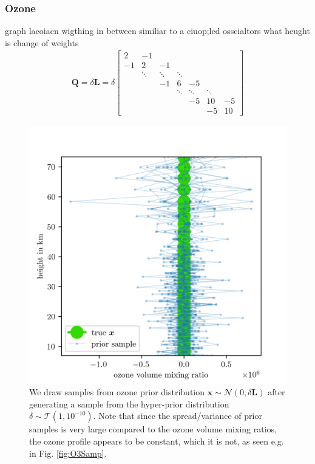 \subsubsection{Ozone}
graph lacoiacn 
wigthing in between
similiar to a ciuop;led osscialtors
what heught is change of weights
\begin{align}
	\bm{Q}= \delta \bm{L} =
	\delta
	\begin{bmatrix}
		2 & -1 & & &  \\
		-1 & 2 & -1 & &   \\
		& \ddots & \ddots & \ddots &\\ 
		&   & -1 & 6 & -5 \\
		& & & \ddots & \ddots & \ddots  \\ 
		& & & &  -5 & 10 & -5 \\
		& & & & & -5 & 10 
	\end{bmatrix} 
\label{eq:GLapl} 
\end{align}
\begin{figure}[ht!]
	\centering
	\includegraphics{OzonePrior.png}
	\caption[Samples from ozone prior distribution.]{We draw samples from ozone prior distribution $\bm{x} \sim \mathcal{N}(0,\delta \bm{L})$ after generating a sample from the hyper-prior distribution $\delta \sim \mathcal{T}(1,10^{-10})$. Note that since the spread/variance of prior samples is very large compared to the ozone volume mixing ratios, the ozone profile appears to be constant, which it is not, as seen e.g. in Fig. \ref{fig:O3Samp}.}
	\label{fig:O3Prior}
\end{figure}

